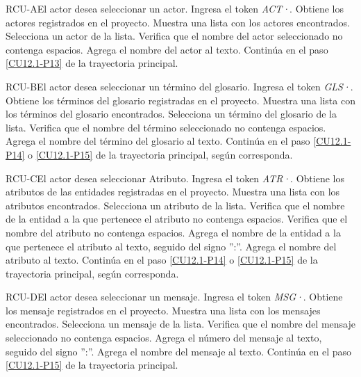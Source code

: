 	
	\begin{UCtrayectoriaA}{RCU-A}{El actor desea seleccionar un actor.}
		\UCpaso[\UCactor] Ingresa el token {\em ACT·}.
		\UCpaso[\UCsist] Obtiene los actores registrados en el proyecto. 
		\UCpaso[\UCsist] Muestra una lista con los actores encontrados.
		\UCpaso[\UCactor] Selecciona un actor de la lista.
		\UCpaso[\UCsist] Verifica que el nombre del actor seleccionado no contenga espacios. 
		\UCpaso[\UCsist] Agrega el nombre del actor al texto.
		\UCpaso Continúa en el paso \ref{CU12.1-P13} de la trayectoria principal.
	\end{UCtrayectoriaA}

	\begin{UCtrayectoriaA}{RCU-B}{El actor desea seleccionar un término del glosario.}
		\UCpaso[\UCactor] Ingresa el token {\em GLS·}.
		\UCpaso[\UCsist] Obtiene los términos del glosario registradas en el proyecto. 
		\UCpaso[\UCsist] Muestra una lista con los términos del glosario encontrados.
		\UCpaso[\UCactor] Selecciona un término del glosario de la lista.
		\UCpaso[\UCsist] Verifica que el nombre del término seleccionado no contenga espacios. 
		\UCpaso[\UCsist] Agrega el nombre del término del glosario al texto.
		\UCpaso Continúa en el paso \ref{CU12.1-P14} o \ref{CU12.1-P15} de la trayectoria principal, según corresponda.
	\end{UCtrayectoriaA}

	\begin{UCtrayectoriaA}{RCU-C}{El actor desea seleccionar Atributo.}
		\UCpaso[\UCactor] Ingresa el token {\em ATR·}. 
		\UCpaso[\UCsist] Obtiene los atributos de las entidades registradas en el proyecto.
		\UCpaso[\UCsist] Muestra una lista con los atributos encontrados.
		\UCpaso[\UCactor] Selecciona un atributo de la lista.
		\UCpaso[\UCsist] Verifica que el nombre de la entidad a la que pertenece el atributo no contenga espacios. 
		\UCpaso[\UCsist] Verifica que el nombre del atributo no contenga espacios. 
		\UCpaso[\UCsist] Agrega el nombre de la entidad a la que pertenece el atributo al texto, seguido del signo '':''.
		\UCpaso[\UCsist] Agrega el nombre del atributo al texto.
		\UCpaso Continúa en el paso \ref{CU12.1-P14} o \ref{CU12.1-P15} de la trayectoria principal, según corresponda.
	\end{UCtrayectoriaA}

	\begin{UCtrayectoriaA}{RCU-D}{El actor desea seleccionar un mensaje.}
		\UCpaso[\UCactor] Ingresa el token {\em MSG·}. 
		\UCpaso[\UCsist] Obtiene los mensaje registrados en el proyecto.
		\UCpaso[\UCsist] Muestra una lista con los mensajes encontrados.
		\UCpaso[\UCactor] Selecciona un mensaje de la lista.
		\UCpaso[\UCsist] Verifica que el nombre del mensaje seleccionado no contenga espacios. 
		\UCpaso[\UCsist] Agrega el número del mensaje al texto, seguido del signo '':''.
		\UCpaso[\UCsist] Agrega el nombre del mensaje al texto.
		\UCpaso Continúa en el paso \ref{CU12.1-P15} de la trayectoria principal.
	\end{UCtrayectoriaA}

